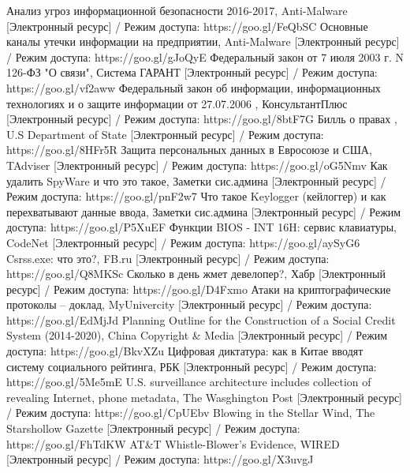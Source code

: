 \begin{thebibliography}{}
	Анализ угроз информационной безопасности 2016-2017, Anti-Malware [Электронный ресурс] / Режим доступа:   https://goo.gl/FeQbSC
	Основные каналы утечки информации на предприятии, Anti-Malware [Электронный ресурс] / Режим доступа:   https://goo.gl/gJoQyE
	Федеральный закон от 7 июля 2003 г. N 126-ФЗ
	"О связи", Система ГАРАНТ [Электронный ресурс] / Режим доступа:   https://goo.gl/vf2aww
	Федеральный закон
	об информации, информационных  технологиях
и о защите информации от 27.07.2006
, КонсультантПлюс [Электронный ресурс] / Режим доступа: https://goo.gl/8btF7G
	Билль о правах
, U.S Department of State  [Электронный ресурс] / Режим доступа: https://goo.gl/8HFr5R
		Защита персональных данных	в Евросоюзе и США, TAdviser  [Электронный ресурс] / Режим доступа: https://goo.gl/oG5Nmv
		Как удалить SpyWare и что это такое, Заметки сис.админа  [Электронный ресурс] / Режим доступа: https://goo.gl/pnF2w7
		Что такое Keylogger (кейлоггер) и как перехватывают данные ввода, Заметки сис.админа  [Электронный ресурс] / Режим доступа: https://goo.gl/P5XuEF
		Функции BIOS - INT 16H: сервис клавиатуры, CodeNet [Электронный ресурс] / Режим доступа: https://goo.gl/aySyG6
	Csrss.exe: что это?, FB.ru [Электронный ресурс] / Режим доступа: https://goo.gl/Q8MKSc
	Сколько в день жмет девелопер?, Хабр [Электронный ресурс] / Режим  доступа: https://goo.gl/D4Fxmo
	Атаки на криптографические протоколы -- доклад, MyUnivercity [Электронный ресурс] / Режим   доступа: https://goo.gl/EdMjJd
	Planning Outline for the Construction of a Social Credit System (2014-2020), China Copyright \& Media [Электронный ресурс] / Режим доступа: https://goo.gl/BkvXZu
	Цифровая диктатура: как в Китае вводят систему социального рейтинга, РБК [Электронный ресурс] / Режим доступа: https://goo.gl/5Me5mE
	U.S. surveillance architecture includes collection of revealing Internet, phone metadata, The Wasghington Post [Электронный ресурс] / Режим доступа: https://goo.gl/CpUEbv
	 Blowing in the Stellar Wind, The Starshollow Gazette [Электронный ресурс] / Режим доступа: https://goo.gl/FhTdKW
	 AT\&T Whistle-Blower's Evidence, WIRED [Электронный ресурс] / Режим доступа: https://goo.gl/X3uvgJ

\end{thebibliography}
